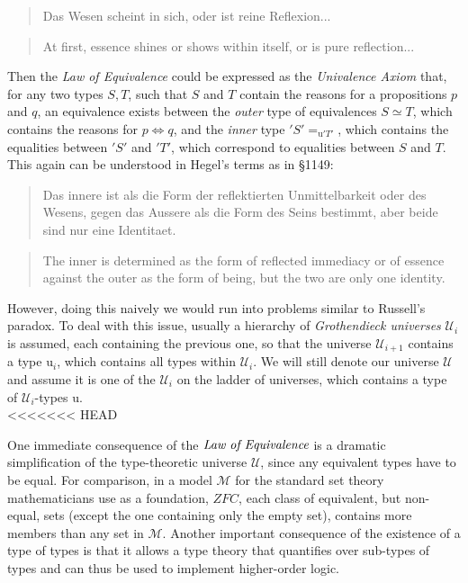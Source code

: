 \documentclass{article}
\begin{document}
\begin{quote}
    Das Wesen scheint in sich, oder ist  reine Reflexion...
\end{quote}

\begin{quote}
    At first, essence shines or shows within itself, or is pure reflection...
\end{quote}

Then the \emph{Law of Equivalence} could be expressed as the \emph{Univalence Axiom} that, for any two
types $S,T$, such that $S$ and $T$ contain the reasons for a propositions $p$ and $q$, an equivalence
exists between the \emph{outer} type of equivalences $S\simeq T$, which contains the reasons for $p\Leftrightarrow
q$, and the \emph{inner} type $'S'=_{\mathrm{u} 'T'}$, which contains the equalities between $'S'$ and
$'T'$, which correspond to equalities between $S$ and $T$. This again can be understood in Hegel's terms
as in §1149:

\begin{quote}
    Das innere ist als die Form der reflektierten Unmittelbarkeit oder des Wesens, gegen das Aussere als
die Form des Seins bestimmt, aber beide sind nur eine Identitaet.
\end{quote}

\begin{quote}
    The inner is determined as the form of reflected immediacy or of essence against the outer as the
form of being, but the two are only one identity.
\end{quote}

However, doing this naively we would run into problems similar to Russell's paradox. To deal with this
issue, usually a hierarchy of \emph{Grothendieck universes} $\mathcal{U}_i$ is assumed, each containing
the previous one, so that the universe $\mathcal{U}_{i+1}$ contains a type $\mathrm{u}_i$, which contains
all types within $\mathcal{U}_i$. We will still denote our universe $\mathcal{U}$ and assume it is one
of the $\mathcal{U}_{i}$ on the ladder of universes, which contains a type of $\mathcal{U}_i$-types $\mathrm{u}$.
\\
<<<<<<< HEAD

One immediate consequence of the $\emph{Law of Equivalence}$ is a dramatic simplification of the type-theoretic
universe $\mathcal{U}$, since any equivalent types have to be equal. For comparison, in a model $\mathcal{M}$
for the standard set theory mathematicians use as a foundation, $ZFC$, each class of equivalent, but non-equal,
sets (except the one containing only the empty set), contains more members than any set in $\mathcal{M}$.
Another important consequence of the existence of a type of types is that it allows a type theory that
quantifies over sub-types of types and can thus be used to implement higher-order logic. 
\end{document}
